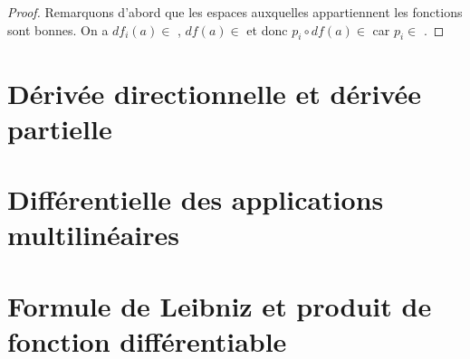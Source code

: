 \begin{proof}
	Remarquons d'abord que les espaces auxquelles appartiennent les fonctions
	sont bonnes. On a $df_{i}(a) \in $ , $df(a) \in
	$  et donc $p_{i} \circ df(a) \in $
	 car $p_{i} \in $
	.
\end{proof}

\section{Dérivée directionnelle et dérivée partielle}

\begin{definition}
	\label{directionnal_application_definition}

\end{definition}

\begin{definition}
	\label{partial_application_definition}

\end{definition}

\section{Différentielle des applications multilinéaires}

\section{Formule de Leibniz et produit de fonction différentiable}

